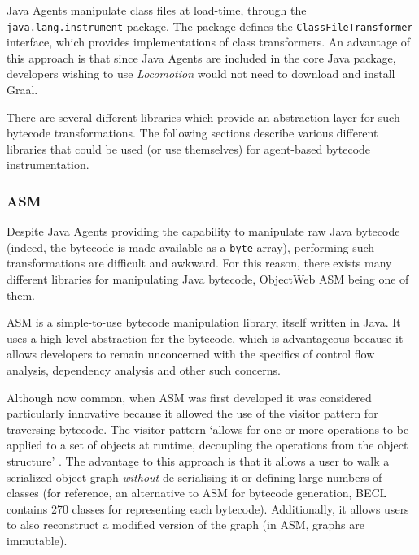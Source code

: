                 Java Agents manipulate class files at load-time, through the \texttt{java.lang.instrument} package. The package defines the \texttt{ClassFileTransformer} interface, which provides implementations of class transformers. An advantage of this approach is that since Java Agents are included in the core Java package, developers wishing to use \textit{Locomotion} would not need to download and install Graal.

                There are several different libraries which provide an abstraction layer for such bytecode transformations. The following sections describe various different libraries that could be used (or use themselves) for agent-based bytecode instrumentation.

                \subsubsection{ASM} \label{sec:instrumentation/bytecode-instr/asm}
                Despite Java Agents providing the capability to manipulate raw Java bytecode (indeed, the bytecode is made available as a \texttt{byte} array), performing such transformations are difficult and awkward. For this reason, there exists many different libraries for manipulating Java bytecode, ObjectWeb ASM being one of them.

                ASM \citep{Bruneton2002} is a simple-to-use bytecode manipulation library, itself written in Java. It uses a high-level abstraction for the bytecode, which is advantageous because it allows developers to remain unconcerned with the specifics of control flow analysis, dependency analysis and other such concerns.

                Although now common, when ASM was first developed it was considered particularly innovative because it allowed the use of the visitor pattern \citep[p.~331]{Gamma1995} for traversing bytecode. The visitor pattern `allows for one or more operations to be applied to a set of objects at runtime, decoupling the operations from the object structure' \citep{McDonald2008}. The advantage to this approach is that it allows a user to walk a serialized object graph \emph{without} de-serialising it or defining large numbers of classes (for reference, an alternative to ASM for bytecode generation, BECL \citep{ApacheBECL} contains 270 classes for representing each bytecode). Additionally, it allows users to also reconstruct a modified version of the graph (in ASM, graphs are immutable).

